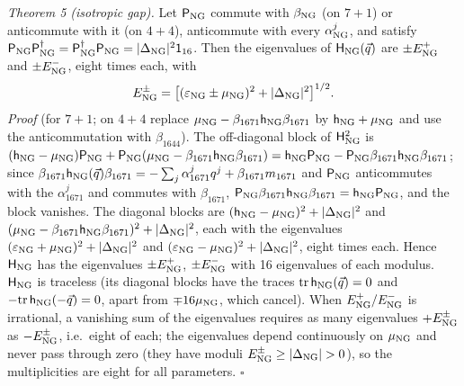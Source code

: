 \emph{Theorem 5 (isotropic gap).} Let $\mathsf P_{\rm NG}$ commute with $\beta_{\rm NG}$ (on $7+1$) or
anticommute with it (on $4+4$), anticommute with every $\alpha^j_{\rm NG}$, and satisfy
$\mathsf P_{\rm NG}\mathsf P_{\rm NG}^\dagger=\mathsf P^\dagger_{\rm NG}\mathsf P_{\rm NG}=\lvert\Delta_{\rm NG}\rvert^2\mathsf 1_{16}$.
Then the eigenvalues of $\mathsf H_{\rm NG}(\vec q)$ are $\pm E^+_{\rm NG}$ and $\pm E^-_{\rm NG}$, eight times
each, with
\begin{equation}
E^\pm_{\rm NG}=\big[(\varepsilon_{\rm NG}\pm\mu_{\rm NG})^2+\lvert\Delta_{\rm NG}\rvert^2\big]^{1/2}.
\label{eq:epm}
\end{equation}
\emph{Proof} (for $7+1$; on $4+4$ replace $\mu_{\rm NG}-\beta_{1671}\mathsf h_{\rm NG}\beta_{1671}$ by
$\mathsf h_{\rm NG}+\mu_{\rm NG}$ and use the anticommutation with $\beta_{1644}$). The off-diagonal block of
$\mathsf H_{\rm NG}^2$ is $(\mathsf h_{\rm NG}-\mu_{\rm NG})\mathsf P_{\rm NG}+\mathsf P_{\rm NG}(\mu_{\rm NG}-
\beta_{1671}\mathsf h_{\rm NG}\beta_{1671})=\mathsf h_{\rm NG}\mathsf P_{\rm NG}-\mathsf P_{\rm NG}\beta_{1671}
\mathsf h_{\rm NG}\beta_{1671}$; since $\beta_{1671}\mathsf h_{\rm NG}(\vec q)\beta_{1671}=-\sum_j\alpha^j_{1671}q^j+
\beta_{1671}m_{1671}$ and $\mathsf P_{\rm NG}$ anticommutes with the $\alpha^j_{1671}$ and commutes with
$\beta_{1671}$, $\mathsf P_{\rm NG}\beta_{1671}\mathsf h_{\rm NG}\beta_{1671}=\mathsf h_{\rm NG}\mathsf P_{\rm NG}$, and the
block vanishes. The diagonal blocks are $(\mathsf h_{\rm NG}-\mu_{\rm NG})^2+\lvert\Delta_{\rm NG}\rvert^2$ and
$(\mu_{\rm NG}-\beta_{1671}\mathsf h_{\rm NG}\beta_{1671})^2+\lvert\Delta_{\rm NG}\rvert^2$, each with the
eigenvalues $(\varepsilon_{\rm NG}+\mu_{\rm NG})^2+\lvert\Delta_{\rm NG}\rvert^2$ and $(\varepsilon_{\rm NG}-
\mu_{\rm NG})^2+\lvert\Delta_{\rm NG}\rvert^2$, eight times each. Hence $\mathsf H_{\rm NG}$ has the eigenvalues
$\pm E^+_{\rm NG}$, $\pm E^-_{\rm NG}$ with 16 eigenvalues of each modulus. $\mathsf H_{\rm NG}$ is traceless
(its diagonal blocks have the traces $\mathrm{tr}\,\mathsf h_{\rm NG}(\vec q)=0$ and
$-\mathrm{tr}\,\mathsf h_{\rm NG}(-\vec q)=0$, apart from $\mp16\mu_{\rm NG}$, which cancel). When
$E^+_{\rm NG}/E^-_{\rm NG}$ is irrational, a vanishing sum of the eigenvalues requires as many eigenvalues
$+E^\pm_{\rm NG}$ as $-E^\pm_{\rm NG}$, i.e.\ eight of each; the eigenvalues depend continuously on
$\mu_{\rm NG}$ and never pass through zero (they have moduli $E^\pm_{\rm NG}\ge\lvert\Delta_{\rm NG}\rvert>0$),
so the multiplicities are eight for all parameters. $\square$

